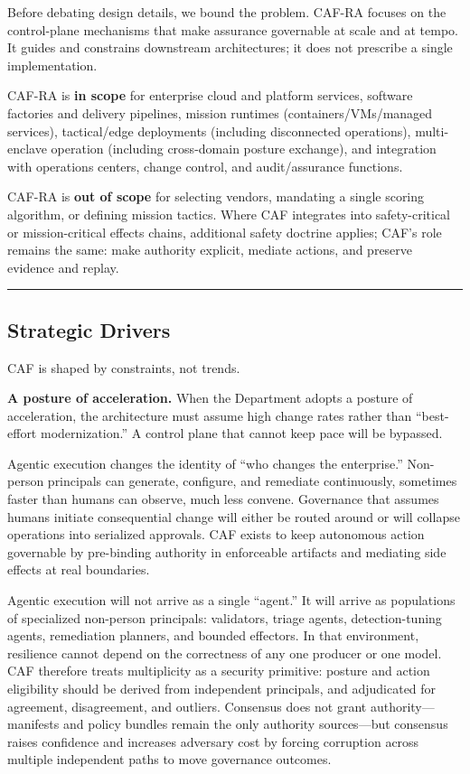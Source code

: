 \documentclass[11pt]{article}
\begin{document}
Before debating design details, we bound the problem. CAF-RA focuses on
the control-plane mechanisms that make assurance governable at scale and
at tempo. It guides and constrains downstream architectures; it does not
prescribe a single implementation. \cite{ACPRA}

CAF-RA is \textbf{in scope} for enterprise cloud and platform services,
software factories and delivery pipelines, mission runtimes
(containers/VMs/managed services), tactical/edge deployments (including
disconnected operations), multi-enclave operation (including
cross-domain posture exchange), and integration with operations centers,
change control, and audit/assurance functions.

CAF-RA is \textbf{out of scope} for selecting vendors, mandating a
single scoring algorithm, or defining mission tactics. Where CAF
integrates into safety-critical or mission-critical effects chains,
additional safety doctrine applies; CAF's role remains the same: make
authority explicit, mediate actions, and preserve evidence and replay.

\begin{center}\rule{0.5\linewidth}{0.5pt}\end{center}

\hypertarget{strategic-drivers}{%
\subsection{Strategic Drivers}\label{strategic-drivers}}

CAF is shaped by constraints, not trends.

\textbf{A posture of acceleration.} When the Department adopts a posture
of acceleration, the architecture must assume high change rates rather
than ``best-effort modernization.'' A control plane that cannot keep
pace will be bypassed.

Agentic execution changes the identity of ``who changes the enterprise.'' Non-person principals can generate, configure, and remediate continuously, sometimes faster than humans can observe, much less convene. Governance that assumes humans initiate consequential change will either be routed around or will collapse operations into serialized approvals. CAF exists to keep autonomous action governable by pre-binding authority in enforceable artifacts and mediating side effects at real boundaries.

Agentic execution will not arrive as a single ``agent.'' It will arrive as populations of specialized non-person principals: validators, triage agents, detection-tuning agents, remediation planners, and bounded effectors. In that environment, resilience cannot depend on the correctness of any one producer or one model. CAF therefore treats multiplicity as a security primitive: posture and action eligibility should be derived from independent principals, and adjudicated for agreement, disagreement, and outliers. Consensus does not grant authority---manifests and policy bundles remain the only authority sources---but consensus raises confidence and increases adversary cost by forcing corruption across multiple independent paths to move governance outcomes.
\end{document}
